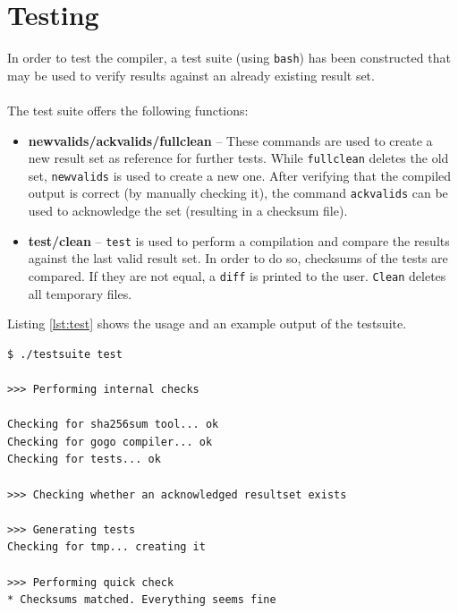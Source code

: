 \documentclass[a4paper]{scrartcl}
\let\chapter\section
\let\section\subsection
\let\subsection\subsubsection
\let\subsubsection\paragraph
\let\paragraph\subparagraph
\let\subparagraph\undefined
\begin{document}
  \chapter{Testing}
    In order to test the compiler, a test suite (using \texttt{bash}) has been 
    constructed that may be used to verify results against an already existing 
    result set. \\ \\
    The test suite offers the following functions:
    \begin{itemize}
      \item \textbf{newvalids/ackvalids/fullclean} -- These commands are used to
        create a new result set as reference for further tests. While 
        \texttt{fullclean} deletes the old set, \texttt{newvalids} is used to 
        create a new one. After verifying that the compiled output is correct 
        (by manually checking it), the command \texttt{ackvalids} can be used to 
        acknowledge the set (resulting in a checksum file). 
      \item \textbf{test/clean} -- \texttt{test} is used to perform a 
        compilation and compare the results against the last valid result set. 
        In order to do so, checksums of the tests are compared. If they are not 
        equal, a \texttt{diff} is printed to the user. \texttt{Clean} deletes
        all temporary files.
    \end{itemize}
    Listing \ref{lst:test} shows the usage and an example output of the testsuite.
\lstset{
language=bash
}
    \begin{lstlisting}[caption=Testsuite example,label=lst:test]
$ ./testsuite test

>>> Performing internal checks

Checking for sha256sum tool... ok
Checking for gogo compiler... ok
Checking for tests... ok

>>> Checking whether an acknowledged resultset exists

>>> Generating tests
Checking for tmp... creating it

>>> Performing quick check
* Checksums matched. Everything seems fine
    \end{lstlisting}
  
  
\end{document}
